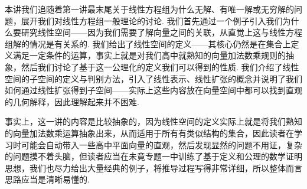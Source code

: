 \begin{summary}

    本讲我们追随着第一讲最末尾关于线性方程组为什么无解、有唯一解或无穷解的问题，展开我们对线性方程组一般理论的讨论. 我们首先通过一个例子引入我们为什么要研究线性空间——因为我们需要了解向量之间的关联，从直觉上这与线性方程组解的情况是有关系的. 我们给出了线性空间的定义——其核心仍然是在集合上定义满足一定条件的运算，事实上就是对我们高中就熟知的向量加法数乘规则的抽象，然后我们讨论了基于这一公理化的定义我们可以得到的性质. 我们介绍了线性空间的子空间的定义与判别方法，引入了线性表示、线性扩张的概念并说明了我们如何通过线性扩张得到子空间——实际上这些内容放在向量空间中都可以找到直观的几何解释，因此理解起来并不困难.

    事实上，这一讲的内容是比较抽象的，因为线性空间的定义实际上就是将我们熟知的向量加法数乘运算抽象出来，从而适用于所有有类似结构的集合，因此读者在学习时可能会自动带入一些高中平面向量的直观，然后发现显然的问题不用证，复杂的问题摸不着头脑，但读者应当在未竟专题一中训练了基于定义和公理的数学证明思想，我们也尽力给出大量经典的例子，将推导过程写得非常详细，所以整体而言思路应当是清晰易懂的.

\end{summary}

